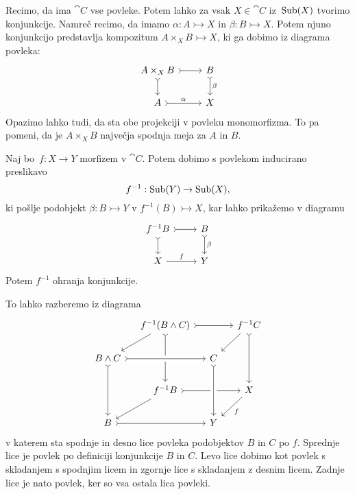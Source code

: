 \documentclass[../kategoricna_logika.tex]{subfiles}
\begin{document}
Recimo, da ima $\cat{C}$ vse povleke.  Potem lahko za vsak
$X \in \cat{C}$ iz~$\operatorname{Sub}(X)$ tvorimo konjunkcije.  Namreč recimo, da
imamo $\alpha : A \rightarrowtail X$ in
${\beta : B \rightarrowtail X}$.  Potem njuno konjunkcijo predstavlja
kompozitum $A \times_X B \rightarrowtail X$, ki ga dobimo iz diagrama
povleka:
\begin{equation*}
  \begin{tikzcd}
    A \times_X B \ar[r, tail] \ar[d, tail] & B \ar[d, tail, "\beta"] \\
    A \ar[r, tail, "\alpha"] & X
  \end{tikzcd}
\end{equation*}
Opazimo lahko tudi, da sta obe projekciji v povleku monomorfizma.  To
pa pomeni, da je $A \times_X B$ največja spodnja meja za $A$ in $B$.
\begin{lema}
Naj bo~$f : X \to Y$ morfizem v $\cat{C}$.  Potem dobimo s povlekom
inducirano preslikavo
$$f^{-1} : \operatorname{Sub}(Y) \to \operatorname{Sub}(X),$$
ki pošlje podobjekt $\beta : B \rightarrowtail Y$ v
$f^{-1}(B) \rightarrowtail X$, kar lahko prikažemo v diagramu
\begin{equation*}
  \begin{tikzcd}
    f^{-1}B \ar[r, tail] \ar[d, tail] & B \ar[d, tail, "\beta"] \\
    X \ar[r, "f"] & Y
  \end{tikzcd}
\end{equation*}
  Potem $f^{-1}$ ohranja konjunkcije.
\end{lema}
\begin{dokaz}
  To lahko razberemo iz diagrama
  \begin{equation*}
    \begin{tikzcd}[column sep=small, row sep=normal]
      & f^{-1}(B \land C) \ar[dl] \ar[dd, tail] \ar[rr, tail] & & f^{-1}C \ar[dl] \ar[dd, tail] \\
      B \land C \ar[dd, tail] \ar[rr, crossing over, tail] & & C  & \\
      & f^{-1}B \ar[dl] \ar[rr, tail] & & X \ar[dl, "f"] \\
      B \ar[rr, tail] & & Y \ar[from=uu, crossing over, tail] &
    \end{tikzcd}
  \end{equation*}
  v katerem sta spodnje in desno lice povleka podobjektov $B$ in $C$ po $f$.
  Sprednje lice je povlek po definiciji konjunkcije $B$ in $C$.
  Levo lice dobimo kot povlek s skladanjem s spodnjim licem in
  zgornje lice s skladanjem z desnim licem.
  Zadnje lice je nato povlek, ker so vsa ostala lica povleki.
\end{dokaz}
\end{document}

